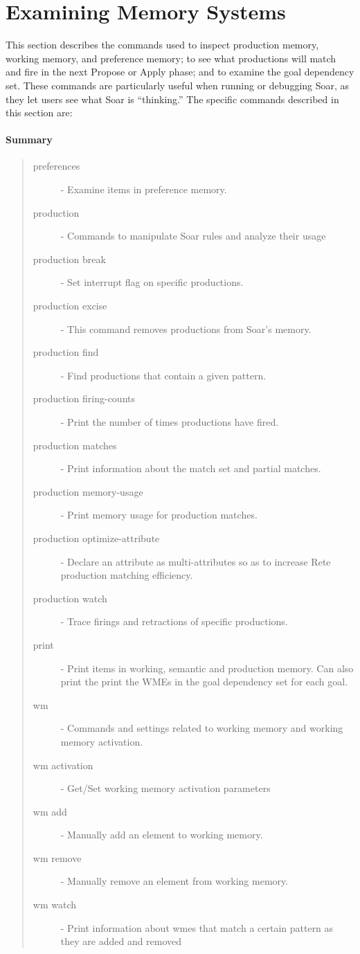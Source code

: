 





\section{Examining Memory Systems}
\label{MEMORY}

This section describes the commands used to inspect production memory,
working memory, and preference memory; to see what productions will 
match and fire in the next Propose or Apply phase;  and to examine the 
goal dependency set.  These commands are particularly useful when
running or debugging Soar, as they let users see what Soar is ``thinking.''
The specific commands described in this section are:

\paragraph{Summary}
\begin{quote}
\begin{description}
\item[preferences] - Examine items in preference memory.
\item[production] - Commands to manipulate Soar rules and analyze their usage
\item[production break] - Set interrupt flag on specific productions.
\item[production excise] - This command removes productions from Soar's memory.
\item[production find] - Find productions that contain a given pattern.
\item[production firing-counts] - Print the number of times productions have fired.
\item[production matches] - Print information about the match set and partial matches.
\item[production memory-usage] - Print memory usage for production matches.
\item[production optimize-attribute] - Declare an attribute as multi-attributes so as to increase Rete production matching efficiency.
\item[production watch] - Trace firings and retractions of specific productions.
\item[print] - Print items in working, semantic and production memory.  Can also print the print the WMEs in the goal dependency set for each goal.
\item[wm] - Commands and settings related to working memory and working memory activation.
\item[wm activation] - Get/Set working memory activation parameters
\item[wm add] - Manually add an element to working memory.
\item[wm remove] - Manually remove an element from working memory.
\item[wm watch] - Print information about wmes that match a certain pattern as they are added and removed

\end{description}
\end{quote}

